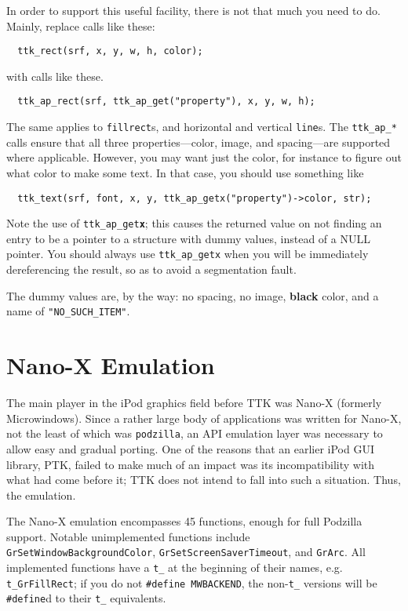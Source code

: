 \documentclass[12pt,letterpaper]{report}
\def\pz{\texttt{podzilla}}
\let\ttt\tt
\def\tt{\def\_{{\ttt\char`\_}}\ttt}
\def\texttt#1{{\tt #1}}
\begin{document}
In order to support this useful facility, there is not that much you need to do.
Mainly, replace calls like these:
\begin{verbatim}
  ttk_rect(srf, x, y, w, h, color);
\end{verbatim}
with calls like these.
\begin{verbatim}
  ttk_ap_rect(srf, ttk_ap_get("property"), x, y, w, h);
\end{verbatim}
The same applies
to \verb|fillrect|s, and horizontal and vertical \verb|line|s. The \verb|ttk_ap_*| calls
ensure that all three properties---color, image, and spacing---are supported where applicable.
However, you may want just the color, for instance to figure out what color to make some text.
In that case, you should use something like
\begin{verbatim}
  ttk_text(srf, font, x, y, ttk_ap_getx("property")->color, str);
\end{verbatim}
Note the use of \verb|ttk_ap_get|\texttt{\textbf{x}}; this causes the returned
value on not finding an entry to be a pointer to a structure with dummy values, instead of
a NULL pointer. You should always use \verb|ttk_ap_getx| when you will be immediately
dereferencing the result, so as to avoid a segmentation fault.

The dummy values are, by the way: no spacing, no image, {\bf black} color, and a name of
\verb|"NO_SUCH_ITEM"|.

\section{Nano-X Emulation}
The main player in the iPod graphics field before TTK was Nano-X (formerly Microwindows).
Since a rather large body of applications was written for Nano-X, not the least of which was \pz,
an API emulation layer was necessary to allow easy and gradual porting. One of the reasons
that an earlier iPod GUI library, PTK, failed to make much of an impact was its incompatibility
with what had come before it; TTK does not intend to fall into such a situation. Thus, the emulation.

The Nano-X emulation encompasses 45 functions, enough for full Podzilla support. Notable
unimplemented functions include \verb|GrSetWindowBackground|\-\verb|Color|, \verb|GrSetScreenSaverTimeout|,
and \verb|GrArc|. All implemented functions have a \verb|t_| at the beginning of their names, e.g.
\verb|t_GrFillRect|; if you do not \verb|#define MWBACKEND|, the non-\verb|t_| versions will be
\verb|#define|d to their \verb|t_| equivalents.
\end{document}
